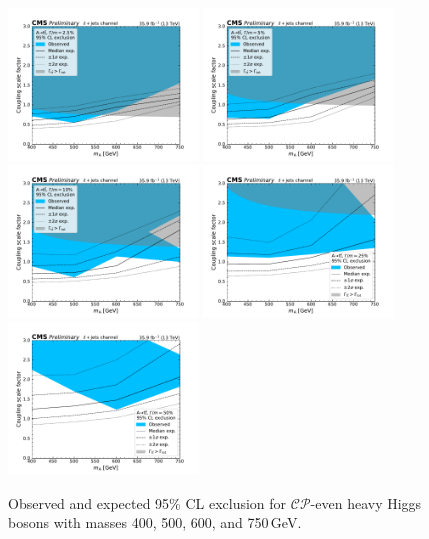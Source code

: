 \begin{figure}
  \centering
  \includegraphics[width=0.45\textwidth]{fig/chapt7/stat/limits/A-relW2p5.pdf}
  \includegraphics[width=0.45\textwidth]{fig/chapt7/stat/limits/A-relW5.pdf} \\
  \includegraphics[width=0.45\textwidth]{fig/chapt7/stat/limits/A-relW10.pdf}
  \includegraphics[width=0.45\textwidth]{fig/chapt7/stat/limits/A-relW25.pdf} \\
  \includegraphics[width=0.45\textwidth]{fig/chapt7/stat/limits/A-relW50.pdf}
  \caption{Observed and expected 95\% CL exclusion for $\mathcal{CP}$-even heavy Higgs bosons with masses 400, 500, 600, and 750\,GeV.}
  \label{Fig:LimitsCPOdd}
\end{figure}

